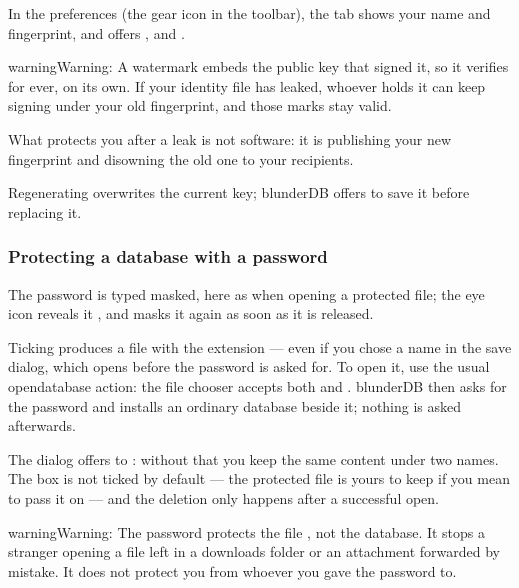 \documentclass[letterpaper,10pt,english]{sphinxmanual}
\begin{document}
\sphinxAtStartPar
In the preferences (the gear icon in the toolbar), the  tab shows your name and fingerprint, and offers ,  and .

\begin{sphinxadmonition}{warning}{Warning:}
\sphinxAtStartPar
{} A watermark embeds the public key that signed it, so it verifies for ever, on its own. If your identity file has leaked, whoever holds it can keep signing under your old fingerprint, and those marks stay valid.

\sphinxAtStartPar
What protects you after a leak is not software: it is publishing your new fingerprint and disowning the old one to your recipients.

\sphinxAtStartPar
Regenerating overwrites the current key; blunderDB offers to save it before replacing it.
\end{sphinxadmonition}


\subsubsection{Protecting a database with a password}
\label{\detokenize{manuel:proteger-une-base-par-un-mot-de-passe}}
\sphinxAtStartPar
The password is typed masked, here as when opening a protected file; the eye icon reveals it , and masks it again as soon as it is released.

\sphinxAtStartPar
Ticking  produces a file with the  extension — even if you chose a  name in the save dialog, which opens before the password is asked for. To open it, use the usual open\sphinxhyphen{}database action: the file chooser accepts both  and . blunderDB then asks for the password and installs an ordinary database beside it; nothing is asked afterwards.

\sphinxAtStartPar
The dialog offers to : without that you keep the same content under two names. The box is not ticked by default — the protected file is yours to keep if you mean to pass it on — and the deletion only happens after a successful open.

\begin{sphinxadmonition}{warning}{Warning:}
\sphinxAtStartPar
The password protects the file , not the database. It stops a stranger opening a file left in a downloads folder or an attachment forwarded by mistake. It does not protect you from whoever you gave the password to.
\end{sphinxadmonition}
\end{document}
